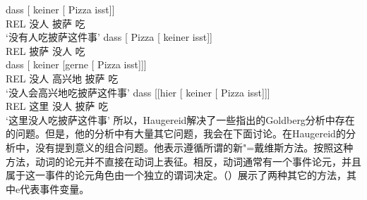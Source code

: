 \begin{exe}
\begin{xlist}[iv.]
\begin{exe}
\begin{xlist}[iv.]
\eal
\ex 
\gll dass [ keiner [ Pizza isst]]\\
     REL {} 没人 {} 披萨 吃\\
\glt `没有人吃披萨这件事'
\ex 
\gll dass [ Pizza [ keiner isst]]\\
	 REL {} 披萨 {} 没人 吃\\
\ex 
\gll dass [ keiner [gerne [ Pizza isst]]]\\
	 REL {} 没人 \spacebr{}高兴地 {} 披萨 吃\\
\glt `没人会高兴地吃披萨这件事'
\ex 
\gll dass [[hier              [ keiner [ Pizza isst]]]\\
     REL \hspaceThis{[[}这里 {}          没人 {} 披萨 吃\\
\glt `这里没人吃披萨这件事'
\zl
所以，Haugereid解决了一些指出的Goldberg分析中存在的问题。但是，他的分析中有大量其它问题，我会在下面讨论。在Haugereid的分析中，没有提到意义的组合问题。他表示遵循所谓的新"=戴维斯方法。按照这种方法，动词的论元并不直接在动词上表征。相反，动词通常有一个事件论元，并且属于这一事件的论元角色由一个独立的谓词决定。（）展示了两种其它的方法，其中e代表事件变量。

\end{xlist}
\end{exe}
\end{xlist}
\end{exe}
